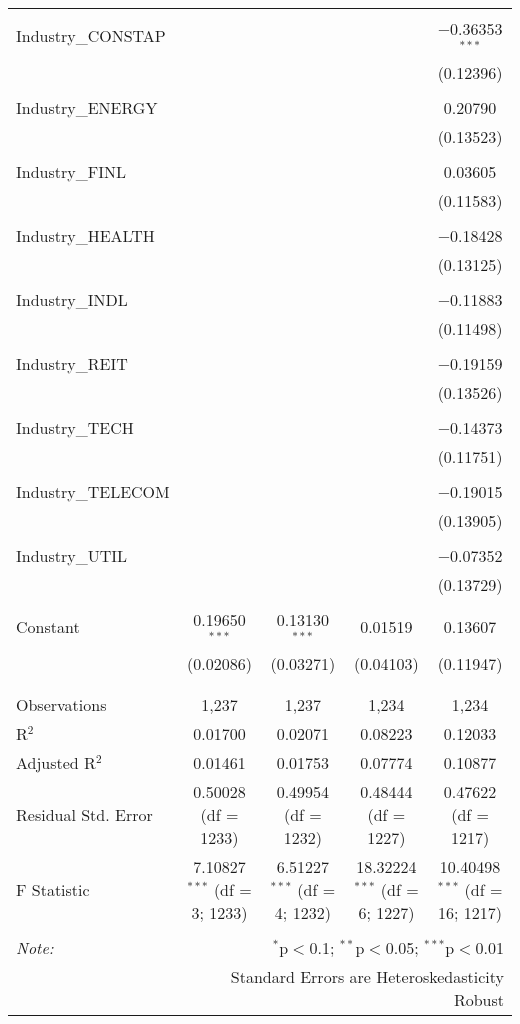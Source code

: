 \begin{table}[!htbp]
\begin{tabular}{@{\extracolsep{5pt}}lcccc}
  & & & & \\ 
 Industry\_CONSTAP &  &  &  & $-$0.36353$^{***}$ \\ 
  &  &  &  & (0.12396) \\ 
  & & & & \\ 
 Industry\_ENERGY &  &  &  & 0.20790 \\ 
  &  &  &  & (0.13523) \\ 
  & & & & \\ 
 Industry\_FINL &  &  &  & 0.03605 \\ 
  &  &  &  & (0.11583) \\ 
  & & & & \\ 
 Industry\_HEALTH &  &  &  & $-$0.18428 \\ 
  &  &  &  & (0.13125) \\ 
  & & & & \\ 
 Industry\_INDL &  &  &  & $-$0.11883 \\ 
  &  &  &  & (0.11498) \\ 
  & & & & \\ 
 Industry\_REIT &  &  &  & $-$0.19159 \\ 
  &  &  &  & (0.13526) \\ 
  & & & & \\ 
 Industry\_TECH &  &  &  & $-$0.14373 \\ 
  &  &  &  & (0.11751) \\ 
  & & & & \\ 
 Industry\_TELECOM &  &  &  & $-$0.19015 \\ 
  &  &  &  & (0.13905) \\ 
  & & & & \\ 
 Industry\_UTIL &  &  &  & $-$0.07352 \\ 
  &  &  &  & (0.13729) \\ 
  & & & & \\ 
 Constant & 0.19650$^{***}$ & 0.13130$^{***}$ & 0.01519 & 0.13607 \\ 
  & (0.02086) & (0.03271) & (0.04103) & (0.11947) \\ 
  & & & & \\ 
\hline \\[-1.8ex] 
Observations & 1,237 & 1,237 & 1,234 & 1,234 \\ 
R$^{2}$ & 0.01700 & 0.02071 & 0.08223 & 0.12033 \\ 
Adjusted R$^{2}$ & 0.01461 & 0.01753 & 0.07774 & 0.10877 \\ 
Residual Std. Error & 0.50028 (df = 1233) & 0.49954 (df = 1232) & 0.48444 (df = 1227) & 0.47622 (df = 1217) \\ 
F Statistic & 7.10827$^{***}$ (df = 3; 1233) & 6.51227$^{***}$ (df = 4; 1232) & 18.32224$^{***}$ (df = 6; 1227) & 10.40498$^{***}$ (df = 16; 1217) \\ 
\hline 
\hline \\[-1.8ex] 
\textit{Note:}  & \multicolumn{4}{r}{$^{*}$p$<$0.1; $^{**}$p$<$0.05; $^{***}$p$<$0.01} \\ 
 & \multicolumn{4}{r}{Standard Errors are Heteroskedasticity Robust} \\ 
\end{tabular} 
\end{table} 
